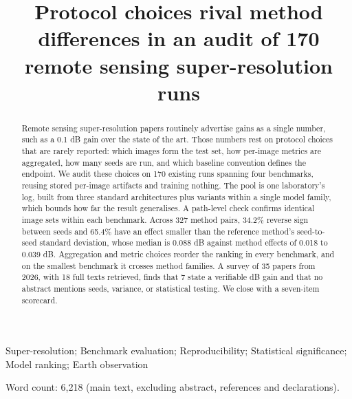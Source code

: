 \documentclass{interact}
\begin{document}

\title{Protocol choices rival method differences in an audit of 170 remote sensing super-resolution runs}

\author{
}

\maketitle

\begin{abstract}
Remote sensing super-resolution papers routinely advertise gains as a single number, such as a 0.1 dB gain over the state of the art. Those numbers rest on protocol choices that are rarely reported: which images form the test set, how per-image metrics are aggregated, how many seeds are run, and which baseline convention defines the endpoint. We audit these choices on 170 existing runs spanning four benchmarks, reusing stored per-image artifacts and training nothing. The pool is one laboratory's log, built from three standard architectures plus variants within a single model family, which bounds how far the result generalises. A path-level check confirms identical image sets within each benchmark. Across 327 method pairs, 34.2\% reverse sign between seeds and 65.4\% have an effect smaller than the reference method's seed-to-seed standard deviation, whose median is 0.088 dB against method effects of 0.018 to 0.039 dB. Aggregation and metric choices reorder the ranking in every benchmark, and on the smallest benchmark it crosses method families. A survey of 35 papers from 2026, with 18 full texts retrieved, finds that 7 state a verifiable dB gain and that no abstract mentions seeds, variance, or statistical testing. We close with a seven-item scorecard.
\end{abstract}

\begin{keywords}
Super-resolution; Benchmark evaluation; Reproducibility; Statistical significance; Model ranking; Earth observation
\end{keywords}

\noindent\small Word count: 6,218 (main text, excluding abstract,
references and declarations).
\end{document}

